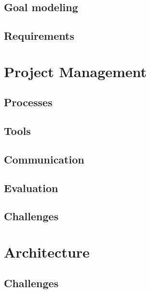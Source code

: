 \documentclass[prodmode,acmtecs]{acmsmall} %
\begin{document}
\subsection{Goal modeling}

\subsection{Requirements}

\section{Project Management}
\subsection{Processes}

\subsection{Tools}

\subsection{Communication}

\subsection{Evaluation}

\subsection{Challenges}


\section{Architecture}

\subsection{Challenges}
\end{document}
